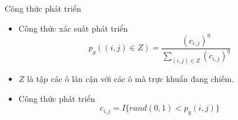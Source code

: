 \begin{frame}{Công thức phát triển}
\begin{itemize}
    \item Công thức xác suất phát triển
    \begin{equation}
    	p_g((i, j) \in Z) = \frac{(c_{i, j})^{\eta}}{\sum_{(i, j) \in Z}^{} (c_{i, j})^{\eta}}
	\end{equation}
	\item $Z$ là tập các ô lân cận với các ô mà trực khuẩn đang chiếm.
	\item Công thức phát triển
	\begin{equation}
		c_{i, j} = I\{rand(0, 1) < p_g(i, j)\}
	\end{equation}
\end{itemize}
\end{frame}